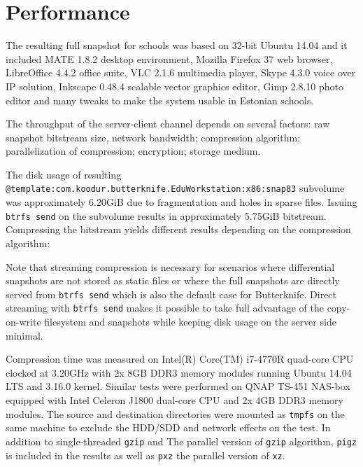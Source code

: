 \documentclass[a4paper,11pt]{kth-mag}
\begin{document}
\section{Performance}

The resulting full snapshot for schools was based on 32-bit Ubuntu 14.04 and
it included MATE 1.8.2 desktop environment, Mozilla Firefox 37 web browser,
LibreOffice 4.4.2 office suite,
VLC 2.1.6 multimedia player,
Skype 4.3.0 voice over IP solution,
Inkscape 0.48.4 scalable vector graphics editor,
Gimp 2.8.10 photo editor and many tweaks
to make the system usable in Estonian schools.

The throughput of the server-client channel depends on
several factors: 
raw snapshot bitstream size,
network bandwidth;
compression algorithm;
parallelization of compression;
encryption;
storage medium.

The disk usage of resulting
\texttt{@template:com.koodur.butterknife.EduWorkstation:x86:snap83}
subvolume was approximately 6.20GiB
due to fragmentation and holes in sparse files.
Issuing \texttt{btrfs send} on the subvolume
results in approximately 5.75GiB bitstream.
Compressing the bitstream yields different
results depending on the compression algorithm:\\


Note that streaming compression is necessary for scenarios
where differential snapshots are not stored as static files
or where the full snapshots are directly served from
\texttt{btrfs send} which is also the default case for Butterknife.
Direct streaming with \texttt{btrfs send} makes it possible
to take full advantage of the copy-on-write filesystem
and snapshots while keeping disk usage on the server side minimal.

Compression time was measured on Intel(R) Core(TM) i7-4770R quad-core CPU 
clocked at 3.20GHz with 2x 8GB DDR3 memory modules running
Ubuntu 14.04 LTS and 3.16.0 kernel.
Similar tests were performed on QNAP TS-451 NAS-box equipped with
Intel Celeron J1800 dual-core CPU and 2x 4GB DDR3 memory modules.
The source and destination directories were
mounted as \texttt{tmpfs} on the same 
machine to exclude the
HDD/SDD and network effects on the test.
In addition to single-threaded \texttt{gzip} and 
The parallel version of \texttt{gzip} algorithm,
\texttt{pigz} is included in the results as well as \texttt{pxz}
the parallel version of \texttt{xz}.
\\
\end{document}
